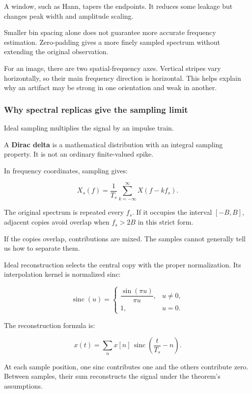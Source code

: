 A window, such as Hann, tapers the endpoints. It reduces some leakage but changes peak width and amplitude scaling.

Smaller bin spacing alone does not guarantee more accurate frequency estimation. Zero-padding gives a more finely sampled spectrum without extending the original observation.

For an image, there are two spatial-frequency axes. Vertical stripes vary horizontally, so their main frequency direction is horizontal. This helps explain why an artifact may be strong in one orientation and weak in another.

\subsubsection{Why spectral replicas give the sampling limit}\label{04-visual-computing-ii-ch043-why-spectral-replicas-give-the-sampling-limit}

\hypertarget{04-visual-computing-ii-ch043-why-spectral-replicas-give-the-sampling-limit}{}

Ideal sampling multiplies the signal by an impulse train.

A \textbf{Dirac delta} is a mathematical distribution with an integral sampling property. It is not an ordinary finite-valued spike.

In frequency coordinates, sampling gives:

\[
X_s(f)=\frac1{T_s}
\sum_{k=-\infty}^{\infty}X(f-kf_s).
\]

The original spectrum is repeated every \(f_s\). If it occupies the interval \([-B,B]\), adjacent copies avoid overlap when \(f_s>2B\) in this strict form.

If the copies overlap, contributions are mixed. The samples cannot generally tell us how to separate them.

Ideal reconstruction selects the central copy with the proper normalization. Its interpolation kernel is normalized sinc:

\[
\operatorname{sinc}(u)=
\begin{cases}
\dfrac{\sin(\pi u)}{\pi u},&u\ne0,\\
1,&u=0.
\end{cases}
\]

The reconstruction formula is:

\[
x(t)=\sum_n x[n]\,
\operatorname{sinc}\left(\frac{t}{T_s}-n\right).
\]

At each sample position, one sinc contributes one and the others contribute zero. Between samples, their sum reconstructs the signal under the theorem's assumptions.

